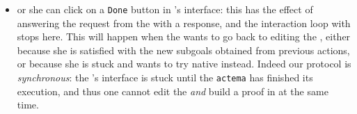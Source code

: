 \begin{itemize}
  \item or she can click on a \texttt{Done} button in 's interface: this
  has the effect of answering the  request from the
   with a  response, and the interaction loop with
   stops here. This will happen when the  wants to go back
  to editing the , either because she is satisfied with the new
  subgoals obtained from previous actions, or because she is stuck and wants to
  try native   instead. Indeed our protocol is \emph{synchronous}: the
  's interface is stuck until the \texttt{actema}  has
  finished its execution, and thus one cannot edit the  \emph{and}
  build a proof in  at the same time.
\end{itemize}

